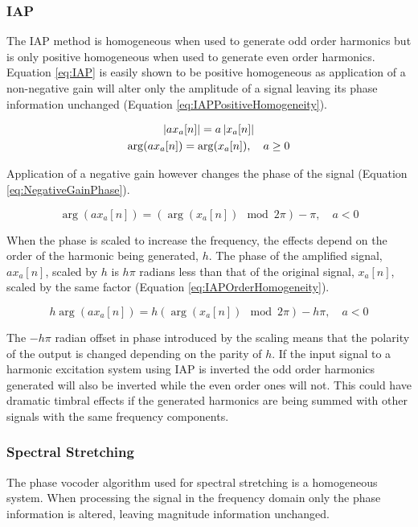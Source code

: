 		\subsubsection*{IAP}
			The IAP method is homogeneous when used to generate odd order harmonics but is only positive
			homogeneous when used to generate even order harmonics. Equation \ref{eq:IAP} is easily shown to be
			positive homogeneous as application of a non-negative gain will alter only the amplitude of a signal
			leaving its phase information unchanged (Equation \ref{eq:IAPPositiveHomogeneity}).

			\begin{gather}
				\left|ax_{a}[n]\right| = a\left|x_{a}[n]\right| \nonumber \\
				\arg(ax_{a}[n]) = \arg(x_{a}[n]), \quad a \geq 0
				\label{eq:IAPPositiveHomogeneity}
			\end{gather}

			Application of a negative gain however changes the phase of the signal (Equation
			\ref{eq:NegativeGainPhase}).
						
			\begin{equation}
				\arg(ax_{a}[n]) = (\arg(x_{a}[n]) \mod 2\pi) - \pi, \quad a < 0
				\label{eq:NegativeGainPhase}
			\end{equation}

			When the phase is scaled to increase the frequency, the effects depend on the order of the harmonic
			being generated, $h$. The phase of the amplified signal, $ax_{a}[n]$, scaled by $h$ is $h\pi$
			radians less than that of the original signal, $x_{a}[n]$, scaled by the same factor (Equation
			\ref{eq:IAPOrderHomogeneity}).

			\begin{equation}
				h\arg(ax_{a}[n]) = h(\arg(x_{a}[n]) \mod 2\pi) - h\pi, \quad a < 0
				\label{eq:IAPOrderHomogeneity}
			\end{equation}

			The $-h\pi$ radian offset in phase introduced by the scaling means that the polarity of the output
			is changed depending on the parity of $h$. If the input signal to a harmonic excitation system using
			IAP is inverted the odd order harmonics generated will also be inverted while the even order ones
			will not. This could have dramatic timbral effects if the generated harmonics are being summed with
			other signals with the same frequency components.

		\subsubsection*{Spectral Stretching}
			The phase vocoder algorithm used for spectral stretching is a homogeneous system. When processing
			the signal in the frequency domain only the phase information is altered, leaving magnitude
			information unchanged. 

